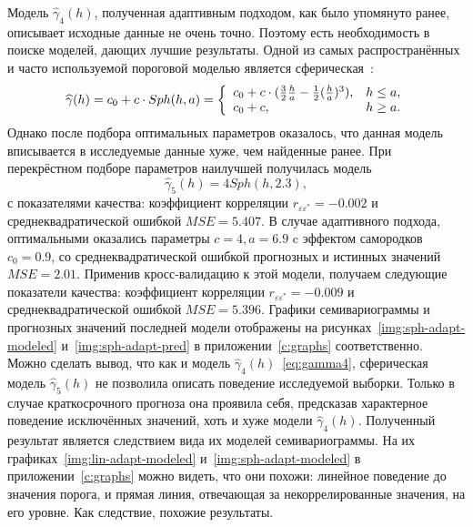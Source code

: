 Модель $ \widehat{\gamma}_4(h) $, полученная адаптивным подходом, как было упомянуто ранее, описывает исходные данные не очень точно. Поэтому есть необходимость в поиске моделей, дающих лучшие результаты. Одной из самых распространённых и часто используемой пороговой моделью является сферическая~\cite{geostat2010}:
\begin{equation*}
	\widehat{\gamma}(h) = c_0 + c \cdot Sph(h, a) = \left\{
		\begin{array}{l l}
			c_0 + c \cdot (\frac{3}{2} \frac{h}{a} - \frac{1}{2}(\frac{h}{a})^3), & h \le a, \\
			c_0 + c, & h \geq a.
		\end{array} \right.
\end{equation*}
Однако после подбора оптимальных параметров оказалось, что данная модель вписывается в исследуемые данные хуже, чем найденные ранее. При перекрёстном подборе параметров наилучшей получилась модель
\begin{equation}
\label{eq:gamma5}
	\widehat{\gamma}_5(h) = 4 Sph(h, 2.3),
\end{equation} %
с показателями качества: коэффициент корреляции $ r_{\varepsilon\varepsilon^{*}} = -0.002$ и среднеквадратической ошибкой $ MSE = 5.407$. В случае адаптивного подхода, оптимальными оказались параметры $ c = 4, a = 6.9 $ c эффектом самородков $ c_0 = 0.9 $, со среднеквадратической ошибкой прогнозных и истинных значений $ MSE = 2.01 $. Применив кросс-валидацию к этой модели, получаем следующие показатели качества: коэффициент корреляции $ r_{\varepsilon\varepsilon^{*}} = -0.009 $ и среднеквадратической ошибкой $ MSE = 5.396 $. Графики семивариограммы и прогнозных значений последней модели отображены на рисунках~\ref{img:sph-adapt-modeled} и~\ref{img:sph-adapt-pred} в приложении~\ref{c:graphs} соответственно. Можно сделать вывод, что как и модель $ \widehat{\gamma}_4(h) $~\eqref{eq:gamma4}, сферическая модель $ \widehat{\gamma}_5(h) $ не позволила описать поведение исследуемой выборки. Только в случае краткосрочного прогноза она проявила себя, предсказав характерное поведение исключённых значений, хоть и хуже модели $ \widehat{\gamma}_4(h) $. Полученный результат является следствием вида их моделей семивариограммы. На их графиках~\ref{img:lin-adapt-modeled} и~\ref{img:sph-adapt-modeled} в приложении~\ref{c:graphs} можно видеть, что они похожи: линейное поведение до значения порога, и прямая линия, отвечающая за некоррелированные значения, на его уровне. Как следствие, похожие результаты.

